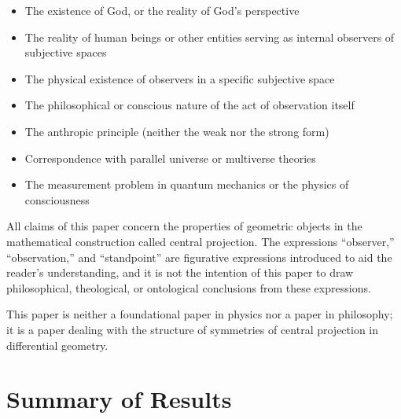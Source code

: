 \documentclass[a4paper,11pt]{article}
\theoremstyle{definition}
\begin{document}
\begin{itemize}
\item The existence of God, or the reality of God's perspective
\item The reality of human beings or other entities serving as internal observers of subjective spaces
\item The physical existence of observers in a specific subjective space
\item The philosophical or conscious nature of the act of observation itself
\item The anthropic principle (neither the weak nor the strong form)
\item Correspondence with parallel universe or multiverse theories
\item The measurement problem in quantum mechanics or the physics of consciousness
\end{itemize}

All claims of this paper concern the properties of geometric objects in the mathematical construction called central projection. The expressions ``observer,'' ``observation,'' and ``standpoint'' are figurative expressions introduced to aid the reader's understanding, and it is not the intention of this paper to draw philosophical, theological, or ontological conclusions from these expressions.

This paper is neither a foundational paper in physics nor a paper in philosophy; it is a paper dealing with the structure of symmetries of central projection in differential geometry.

\section{Summary of Results}
\end{document}
